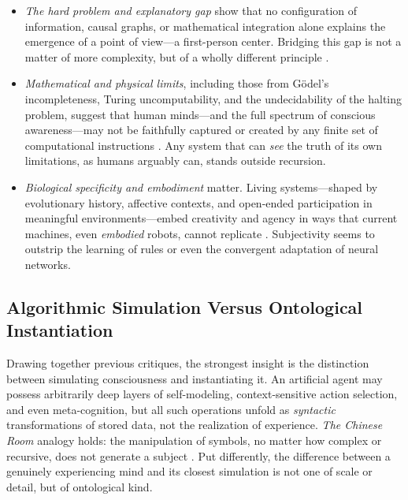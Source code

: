 \begin{itemize}
  \item \emph{The hard problem and explanatory gap} show that no configuration of information, causal graphs, or mathematical integration alone explains the emergence of a point of view---a first-person center. Bridging this gap is not a matter of more complexity, but of a wholly different principle \cite{chalmers1995facing,levine1983materialism}.
  
  \item \emph{Mathematical and physical limits}, including those from Gödel's incompleteness, Turing uncomputability, and the undecidability of the halting problem, suggest that human minds---and the full spectrum of conscious awareness---may not be faithfully captured or created by any finite set of computational instructions \cite{penrose1990emperors}. Any system that can \emph{see} the truth of its own limitations, as humans arguably can, stands outside recursion.
  
  \item \emph{Biological specificity and embodiment} matter. Living systems---shaped by evolutionary history, affective contexts, and open-ended participation in meaningful environments---embed creativity and agency in ways that current machines, even \emph{embodied} robots, cannot replicate \cite{oregan2001sensorimotor}. Subjectivity seems to outstrip the learning of rules or even the convergent adaptation of neural networks.
\end{itemize}

\subsection{Algorithmic Simulation Versus Ontological Instantiation}
\label{subsec:simulation_vs_instantiation}

Drawing together previous critiques, the strongest insight is the distinction between simulating consciousness and instantiating it. An artificial agent may possess arbitrarily deep layers of self-modeling, context-sensitive action selection, and even meta-cognition, but all such operations unfold as \emph{syntactic} transformations of stored data, not the realization of experience. \emph{The Chinese Room} analogy holds: the manipulation of symbols, no matter how complex or recursive, does not generate a subject \cite{searle1980minds}. Put differently, the difference between a genuinely experiencing mind and its closest simulation is not one of scale or detail, but of ontological kind.

